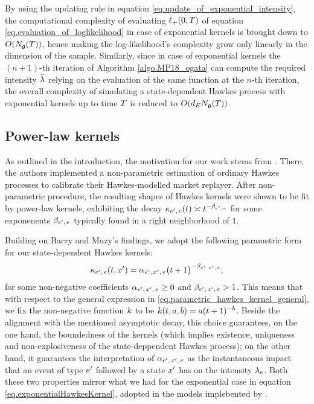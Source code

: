 \documentclass[10pt]{article}
\begin{document}
By using the updating rule in equation \eqref{eq.update_of_exponential_intensity}, the computational complexity of evaluating $\lplus(0,T)$ of equation \eqref{eq.evaluation_of_loglikelihood} in case of exponential kernels is brought down to $O(\groundProc(T))$, hence making the log-likelihood's complexity grow only linearly in the dimension of the sample. 
Similarly, since in case of exponential kernels the $(n+1)$-th iteration of Algorithm \ref{algo.MP18_ogata} can compute the required intensity $\bar{\intensity[]}$ relying on the evaluation of the same function at the $n$-th iteration, the overall complexity of simulating a state-dependent Hawkes process with exponential kernels up to time $\timeHorizon$ is reduced to $O(\numEventTypes\groundProc(\timeHorizon))$.

\subsection{Power-law kernels}\label{sec.powerlaw_kernels}
As outlined in the introduction, the motivation for our work stems from  \citealp{BM14haw}. There, the authors implemented a non-parametric estimation of ordinary Hawkes processes to calibrate their Hawkes-modelled market replayer. After non-parametric procedure, the resulting shapes of Hawkes kernels were shown to be fit by power-law kernels, exhibiting the decay $\hawkesKernel\subscriptee(t) \asymp t^{-\decCoef\subscriptee}$ for some exponenents $\decCoef\subscriptee$ typically found in a right neighborhood of $1$.

Building on Bacry and Muzy's findings, we adopt the following parametric form for our state-dependent Hawkes kernels:
\begin{equation}\label{eq.powerlaw_kernels}
 \hawkesKernel\subscriptee(t,\xone) 
 = \impCoef\subscriptexe \big( t+ 1 \big)^{-\decCoef\subscriptexe},
\end{equation}
for some non-negative coefficients $\impCoef\subscriptexe \geq 0$ and $\decCoef\subscriptexe > 1$. 
This means that with respect to the general expression in \eqref{eq.parametric_hawkes_kernel_general}, we fix the non-negative function $\parametricHawkesKernel$ to be $\parametricHawkesKernel(t,a,b) = a(t+1)^{-b}$.  
Beside the alignment with the mentioned asymptotic decay, this choice guarantees, on the one hand, the boundedness of the kernels (which implies existence, uniqueness and non-explosiveness of the state-deppendent Hawkes process); on the other hand, it guarantees the interpretation of $\impCoef\subscriptexe$ as the instantaneous impact  that an event of type $\eone$ followed by a state $\xone$ has on the intensity $\intensity[e]$. Both these two properties mirror what we had for the exponential case in equation \eqref{eq.exponentialHawkesKernel}, adopted in the models implebented by \citealp{MP18sta}.
\end{document}
